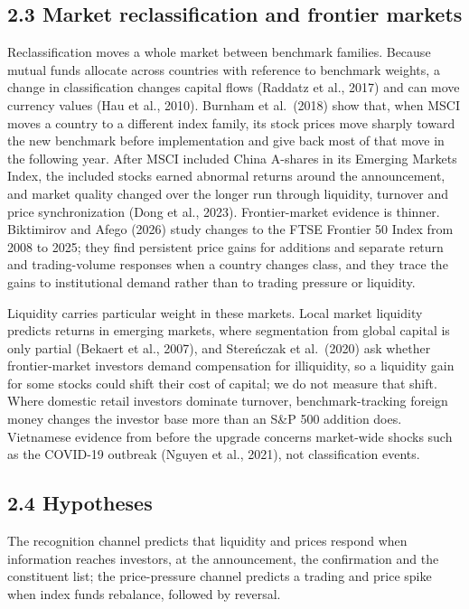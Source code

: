 \documentclass[review,authoryear,12pt]{elsarticle}
\begin{document}
\hypertarget{market-reclassification-and-frontier-markets}{%
\subsection*{2.3 Market reclassification and frontier
markets}}

Reclassification moves a whole market between benchmark families.
Because mutual funds allocate across countries with reference to
benchmark weights, a change in classification changes capital flows
(Raddatz et al., 2017) and can move currency values (Hau et al., 2010).
Burnham et al.~(2018) show that, when MSCI moves a country to a
different index family, its stock prices move sharply toward the new
benchmark before implementation and give back most of that move in the
following year. After MSCI included China A-shares in its Emerging
Markets Index, the included stocks earned abnormal returns around the
announcement, and market quality changed over the longer run through
liquidity, turnover and price synchronization (Dong et al., 2023).
Frontier-market evidence is thinner. Biktimirov and Afego (2026) study
changes to the FTSE Frontier 50 Index from 2008 to 2025; they find
persistent price gains for additions and separate return and
trading-volume responses when a country changes class, and they trace
the gains to institutional demand rather than to trading pressure or
liquidity.

Liquidity carries particular weight in these markets. Local market
liquidity predicts returns in emerging markets, where segmentation from
global capital is only partial (Bekaert et al., 2007), and Stereńczak et
al.~(2020) ask whether frontier-market investors demand compensation for
illiquidity, so a liquidity gain for some stocks could shift their cost
of capital; we do not measure that shift. Where domestic retail
investors dominate turnover, benchmark-tracking foreign money changes
the investor base more than an S\&P 500 addition does. Vietnamese
evidence from before the upgrade concerns market-wide shocks such as the
COVID-19 outbreak (Nguyen et al., 2021), not classification events.

\hypertarget{hypotheses}{%
\subsection*{2.4 Hypotheses}}

The recognition channel predicts that liquidity and prices respond when
information reaches investors, at the announcement, the confirmation and
the constituent list; the price-pressure channel predicts a trading and
price spike when index funds rebalance, followed by reversal.
\end{document}

